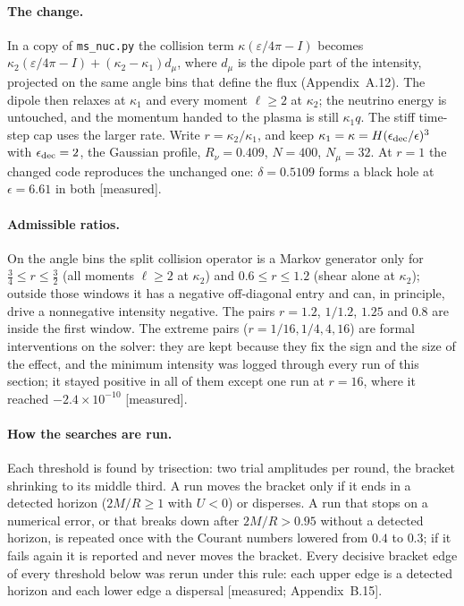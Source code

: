 \documentclass[11pt]{article}
\newcommand{\grade}[1]{\textsf{\small[#1]}}
\begin{document}
\paragraph{The change.} In a copy of \texttt{ms\_nuc.py} the collision term $\kappa(\varepsilon/4\pi-I)$ becomes $\kappa_2(\varepsilon/4\pi-I)+(\kappa_2-\kappa_1)d_\mu$, where $d_\mu$ is the dipole part of the intensity, projected on the same angle bins that define the flux (Appendix~A.12). The dipole then relaxes at $\kappa_1$ and every moment $\ell\ge2$ at $\kappa_2$; the neutrino energy is untouched, and the momentum handed to the plasma is still $\kappa_1q$. The stiff time-step cap uses the larger rate. Write $r=\kappa_2/\kappa_1$, and keep $\kappa_1=\kappa=H(\epsilon_{\rm dec}/\epsilon)^3$ with $\epsilon_{\rm dec}=2$, the Gaussian profile, $R_\nu=0.409$, $N=400$, $N_\mu=32$. At $r=1$ the changed code reproduces the unchanged one: $\delta=0.5109$ forms a black hole at $\epsilon=6.61$ in both \grade{measured}.

\paragraph{Admissible ratios.} On the angle bins the split collision operator is a Markov generator only for $\tfrac34\le r\le\tfrac32$ (all moments $\ell\ge2$ at $\kappa_2$) and $0.6\le r\le1.2$ (shear alone at $\kappa_2$); outside those windows it has a negative off-diagonal entry and can, in principle, drive a nonnegative intensity negative. The pairs $r=1.2$, $1/1.2$, $1.25$ and $0.8$ are inside the first window. The extreme pairs ($r=1/16,1/4,4,16$) are formal interventions on the solver: they are kept because they fix the sign and the size of the effect, and the minimum intensity was logged through every run of this section; it stayed positive in all of them except one run at $r=16$, where it reached $-2.4\times10^{-10}$ \grade{measured}.

\paragraph{How the searches are run.} Each threshold is found by trisection: two trial amplitudes per round, the bracket shrinking to its middle third. A run moves the bracket only if it ends in a detected horizon ($2M/R\ge1$ with $U<0$) or disperses. A run that stops on a numerical error, or that breaks down after $2M/R>0.95$ without a detected horizon, is repeated once with the Courant numbers lowered from $0.4$ to $0.3$; if it fails again it is reported and never moves the bracket. Every decisive bracket edge of every threshold below was rerun under this rule: each upper edge is a detected horizon and each lower edge a dispersal \grade{measured; Appendix~B.15}.
\end{document}
